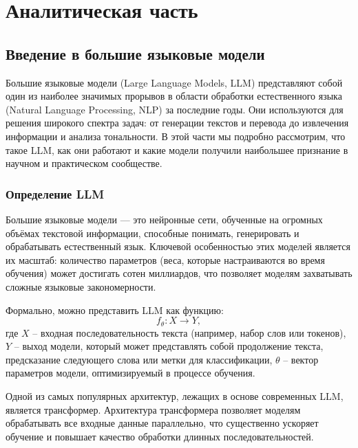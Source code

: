 \chapter{Аналитическая часть}

\section{Введение в большие языковые модели}

Большие языковые модели (Large Language Models, LLM) представляют собой один из наиболее значимых прорывов в области обработки естественного языка (Natural Language Processing, NLP) за последние годы. 
Они используются для решения широкого спектра задач: от генерации текстов и перевода до извлечения информации и анализа тональности. 
В этой части мы подробно рассмотрим, что такое LLM, как они работают и какие модели получили наибольшее признание в научном и практическом сообществе.

\subsection{Определение LLM}

Большие языковые модели — это нейронные сети, обученные на огромных объёмах текстовой информации, способные понимать, генерировать и обрабатывать естественный язык. 
Ключевой особенностью этих моделей является их масштаб: количество параметров (веса, которые настраиваются во время обучения) может достигать сотен миллиардов, 
что позволяет моделям захватывать сложные языковые закономерности.

Формально, можно представить LLM как функцию:
\[
f_\theta: X \rightarrow Y, 
\]
где
\(X\) -- входная последовательность текста (например, набор слов или токенов),
\(Y\) -- выход модели, который может представлять собой продолжение текста, предсказание следующего слова или метки для классификации,
\(\theta\) -- вектор параметров модели, оптимизируемый в процессе обучения.

Одной из самых популярных архитектур, лежащих в основе современных LLM, является трансформер. 
Архитектура трансформера позволяет моделям обрабатывать все входные данные параллельно, 
что существенно ускоряет обучение и повышает качество обработки длинных последовательностей. 

